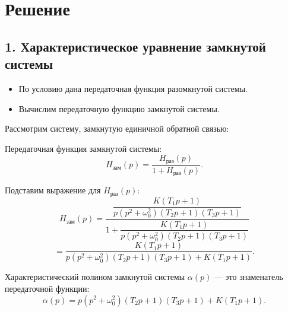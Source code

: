\section*{Решение}

\subsection*{1. Характеристическое уравнение замкнутой системы}

\begin{itemize}
  \item По условию дана передаточная функция разомкнутой системы.
  \item Вычислим передаточную функцию замкнутой системы.
\end{itemize}

Рассмотрим систему, замкнутую единичной обратной связью:

\begin{center}
\end{center}

Передаточная функция замкнутой системы:
\[
H_{\text{зам}}(p) = \frac{H_{\text{раз}}(p)}{1 + H_{\text{раз}}(p)}.
\]

Подставим выражение для $H_{\text{раз}}(p)$:
\[
H_{\text{зам}}(p) = \frac{\dfrac{K(T_1 p + 1)}{p(p^2 + \omega_0^2)(T_2 p + 1)(T_3 p + 1)}}{1 + \dfrac{K(T_1 p + 1)}{p(p^2 + \omega_0^2)(T_2 p + 1)(T_3 p + 1)}}
\]
\[
= \frac{K(T_1 p + 1)}{p(p^2 + \omega_0^2)(T_2 p + 1)(T_3 p + 1) + K(T_1 p + 1)}.
\]

Характеристический полином замкнутой системы $\alpha(p)$ — это знаменатель передаточной функции:
\[
\alpha(p) = p(p^2 + \omega_0^2)(T_2 p + 1)(T_3 p + 1) + K(T_1 p + 1).
\]

